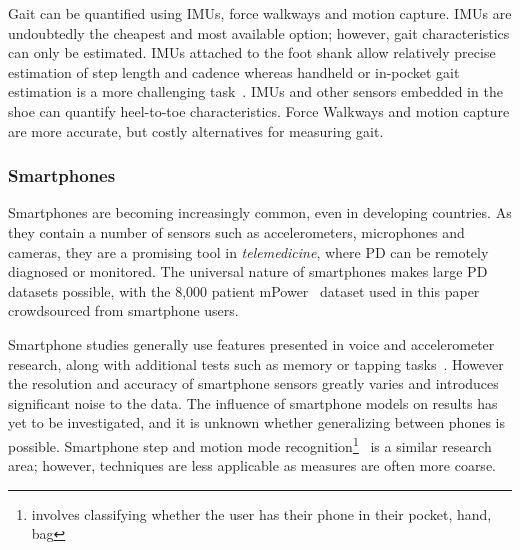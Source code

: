 \documentclass[12pt, twoside]{book}
\renewcommand\emph[1]{\textit{\color{USred}{#1}}}
\begin{document}
Gait can be quantified using IMUs, force walkways and motion capture. IMUs are undoubtedly the cheapest and most available option; however, gait characteristics can only be estimated. IMUs attached to the foot shank allow relatively precise estimation of step length and cadence \cite{barth2011biometric, sijobert2015implementation} whereas handheld or in-pocket gait estimation is a more challenging task~\cite{renaudin2012step,diaz2014step}. IMUs and other sensors embedded in the shoe can quantify heel-to-toe characteristics. Force Walkways and motion capture are more accurate, but costly alternatives for measuring gait.


\subsubsection{Smartphones}
Smartphones are becoming increasingly common, even in developing countries. As they contain a number of sensors such as accelerometers, microphones and cameras, they are a promising tool in \textit{telemedicine}, where PD can be remotely diagnosed or monitored. The universal nature of smartphones makes large PD datasets possible, with the 8,000 patient mPower~\cite{mpower} dataset used in this paper crowdsourced from smartphone users.

Smartphone studies generally use features presented in voice and accelerometer research, along with additional tests such as memory or tapping tasks~\cite{tapping}. However the resolution and accuracy of smartphone sensors greatly varies and introduces significant noise to the data. The influence of smartphone models on results has yet to be investigated, and it is unknown whether generalizing between phones is possible. Smartphone step and motion mode recognition\footnote{\emph{Motion mode recognition} involves classifying whether the user has their phone in their pocket, hand, bag  }~\cite{motionmoderecognition, li2010multimodal} is a similar research area; however, techniques are less applicable as measures are often more coarse.
\end{document}

